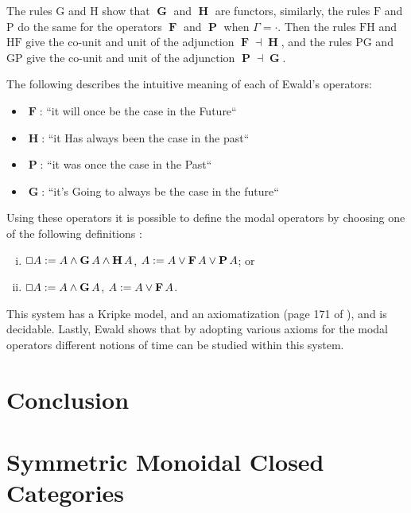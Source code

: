 \documentclass{article}
\let\Diamond\relax
\renewcommand{\Box}{\oblong}
\newcommand{\F}{\mathop{\textbf{F}}}
\renewcommand{\P}{\mathop{\textbf{P}}}
\newcommand{\G}{\mathop{\textbf{G}}}
\renewcommand{\H}{\mathop{\textbf{H}}}
\begin{document}
The rules $\text{G}$ and $\text{H}$ show that $\G$ and $\H$ are
functors, similarly, the rules $\text{F}$ and $\text{P}$ do the same
for the operators $\F$ and $\P$ when $\Gamma = \cdot$.  Then the rules
$\text{FH}$ and $\text{HF}$ give the co-unit and unit of the
adjunction $\F \dashv \H$, and the rules $\text{PG}$ and $\text{GP}$
give the co-unit and unit of the adjunction $\P \dashv \G$.

The following describes the intuitive meaning of each of Ewald's
operators:
\begin{itemize}
\item[] $\F$: ``it will once be the case in the Future``  
\item[] $\H$: ``it Has always been the case in the past``
\item[] $\P$: ``it was once the case in the Past``
\item[] $\G$: ``it's Going to  always be the case in the future``  
\end{itemize}


Using these operators it is possible to define the  modal
operators by choosing one of the following definitions
\cite{ewald1986}:
\begin{enumerate}[i.]
\item $\Box A := A \land \G A \land \H A$, $\Diamond A := A \lor \F A \lor \P A$; or
\item $\Box A := A \land \G A$, $\Diamond A := A \lor \F A$.
\end{enumerate}

This system has a Kripke model, and an axiomatization (page 171 of
\cite{ewald1986}), and is decidable.  Lastly, Ewald shows that by
adopting various axioms for the modal operators different notions of
time can be studied within this system.

\section{Conclusion}




\appendix

\section{Symmetric Monoidal Closed Categories}
\label{sec:symmetric_monoidal_closed_categories}
\end{document}
